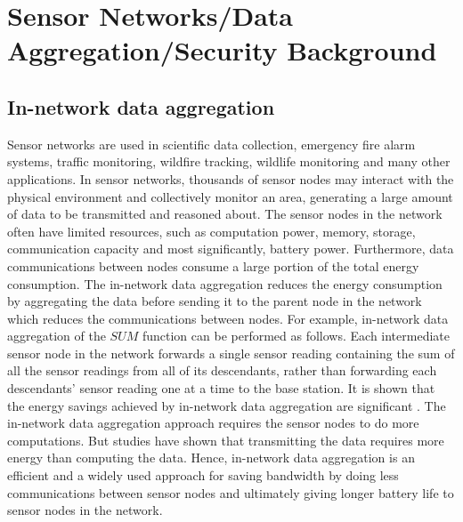 \chapter{Sensor Networks/Data Aggregation/Security Background} 
\label{cha:Sensor Networks/Data Aggregation/Security Background}

\section{In-network data aggregation}
	Sensor networks are used in scientific data collection, emergency fire alarm systems, traffic monitoring, wildfire tracking, wildlife monitoring and many other applications.
	In sensor networks, thousands of sensor nodes may interact with the physical environment and collectively monitor an area, generating a large amount of data to be transmitted and reasoned about.
	The sensor nodes in the network often have limited resources, such as computation power, memory, storage, communication capacity and most significantly, battery power.
	Furthermore, data communications between nodes consume a large portion of the total energy consumption. 
	The in-network data aggregation reduces the energy consumption by aggregating the data before sending it to the parent node in the network which reduces the communications between nodes.
	For example, in-network data aggregation of the $\textit{SUM}$ function can be performed as follows. 
	Each intermediate sensor node in the network forwards a single sensor reading containing the sum of all the sensor readings from all of its descendants, rather than forwarding each descendants' sensor reading one at a time to the base station.
	It is shown that the energy savings achieved by in-network data aggregation are significant \cite{madden2002tag}.
	The in-network data aggregation approach requires the sensor nodes to do more computations.
	But studies have shown that transmitting the data requires more energy than computing the data. 
	Hence, in-network data aggregation is an efficient and a widely used approach for saving bandwidth by doing less communications between sensor nodes and ultimately giving longer battery life to sensor nodes in the network.

